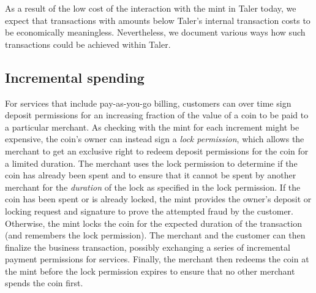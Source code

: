 \documentclass{llncs}
\begin{document}
As a result of the low cost of the interaction with the mint in Taler
today, we expect that transactions with amounts below Taler's internal
transaction costs to be economically meaningless.  Nevertheless, we
document various ways how such transactions could be achieved within
Taler.



\subsection{Incremental spending}

For services that include pay-as-you-go billing, customers can over
time sign deposit permissions for an increasing fraction of the value
of a coin to be paid to a particular merchant.  As checking with the
mint for each increment might be expensive, the coin's owner can
instead sign a {\em lock permission}, which allows the merchant to get
an exclusive right to redeem deposit permissions for the coin for a
limited duration.  The merchant uses the lock permission to determine
if the coin has already been spent and to ensure that it cannot be
spent by another merchant for the {\em duration} of the lock as
specified in the lock permission.  If the coin has been spent or is
already locked, the mint provides the owner's deposit or locking
request and signature to prove the attempted fraud by the customer.
Otherwise, the mint locks the coin for the expected duration of the
transaction (and remembers the lock permission).  The merchant and the
customer can then finalize the business transaction, possibly
exchanging a series of incremental payment permissions for services.
Finally, the merchant then redeems the coin at the mint before the
lock permission expires to ensure that no other merchant spends the
coin first.
\end{document}
